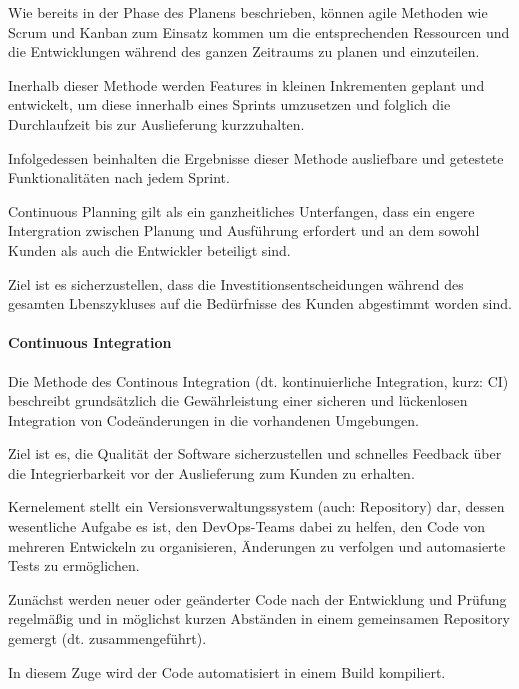 Wie bereits in der Phase des Planens beschrieben, können agile Methoden wie Scrum und Kanban zum Einsatz kommen um die entsprechenden Ressourcen und die Entwicklungen während des ganzen Zeitraums zu planen und einzuteilen.

Inerhalb dieser Methode werden Features in kleinen Inkrementen geplant und entwickelt, um diese innerhalb eines Sprints umzusetzen und folglich die Durchlaufzeit bis zur Auslieferung kurzzuhalten. \cite[S. 266]{tokarski_strategische_2018} 

Infolgedessen beinhalten die Ergebnisse dieser Methode ausliefbare und getestete Funktionalitäten nach jedem Sprint. 

Continuous Planning gilt als ein ganzheitliches Unterfangen, dass ein engere Intergration zwischen Planung und Ausführung erfordert und an dem sowohl Kunden als auch die Entwickler beteiligt sind. \cite{fitzgerald_continuous_2014} 

Ziel ist es sicherzustellen, dass die Investitionsentscheidungen während des gesamten Lbenszykluses auf die Bedürfnisse des Kunden abgestimmt worden sind. 

\paragraph{Continuous Integration}

Die Methode des Continous Integration (dt. kontinuierliche Integration, kurz: CI) beschreibt grundsätzlich die Gewährleistung einer sicheren und lückenlosen Integration von Codeänderungen in die vorhandenen Umgebungen. \cite[S. 266]{tokarski_strategische_2018}  

Ziel ist es, die Qualität der Software sicherzustellen und schnelles Feedback über die Integrierbarkeit vor der Auslieferung zum Kunden zu erhalten. \cite[S. 266]{tokarski_strategische_2018} 

Kernelement stellt ein Versionsverwaltungssystem (auch: Repository) dar, dessen wesentliche Aufgabe es ist, den DevOps-Teams dabei zu helfen, den Code von mehreren Entwickeln zu organisieren, Änderungen zu verfolgen und automasierte Tests zu ermöglichen. 

Zunächst werden neuer oder geänderter Code nach der Entwicklung und Prüfung regelmäßig und in möglichst kurzen Abständen in einem gemeinsamen Repository gemergt (dt. zusammengeführt). \cite[S. 13-16]{sharma_devops_2017}

In diesem Zuge wird der Code automatisiert in einem Build kompiliert. 

